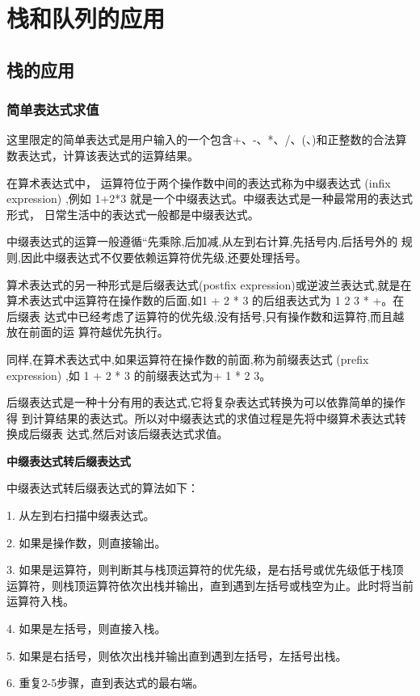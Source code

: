 \documentclass[lang=cn,newtx,10pt,scheme=chinese]{../elegantbook}
\begin{document}
\section{栈和队列的应用}

\subsection{栈的应用}

\subsubsection{简单表达式求值}

这里限定的简单表达式是用户输入的一个包含+、-、*、/、(、)和正整数的合法算数表达式，计算该表达式的运算结果。

在算术表达式中， 运算符位于两个操作数中间的表达式称为中缀表达式 (infix
expression) ,例如 1+2*3 就是一个中缀表达式。中缀表达式是一种最常用的表达式形式，
日常生活中的表达式一般都是中缀表达式。

中缀表达式的运算一般遵循“先乘除,后加减,从左到右计算,先括号内,后括号外的
规则,因此中缀表达式不仅要依赖运算符优先级,还要处理括号。

算术表达式的另一种形式是后缀表达式(postfix expression)或逆波兰表达式,就是在
算术表达式中运算符在操作数的后面,如1 + 2 * 3 的后组表达式为 1 2 3 * +。在后缀表
达式中已经考虑了运算符的优先级,没有括号,只有操作数和运算符,而且越放在前面的运
算符越优先执行。

同样,在算术表达式中,如果运算符在操作数的前面,称为前缀表达式 (prefix
expression) ,如 1 + 2 * 3 的前缀表达式为+ 1 * 2 3。

后缀表达式是一种十分有用的表达式,它将复杂表达式转换为可以依靠简单的操作得
到计算结果的表达式。所以对中缀表达式的求值过程是先将中缀算术表达式转换成后缀表
达式,然后对该后缀表达式求值。


\textbf{中缀表达式转后缀表达式}

中缀表达式转后缀表达式的算法如下：

1. 从左到右扫描中缀表达式。

2. 如果是操作数，则直接输出。

3. 如果是运算符，则判断其与栈顶运算符的优先级，是右括号或优先级低于栈顶运算符，则栈顶运算符依次出栈并输出，直到遇到左括号或栈空为止。此时将当前运算符入栈。

4. 如果是左括号，则直接入栈。

5. 如果是右括号，则依次出栈并输出直到遇到左括号，左括号出栈。

6. 重复2-5步骤，直到表达式的最右端。
\end{document}
